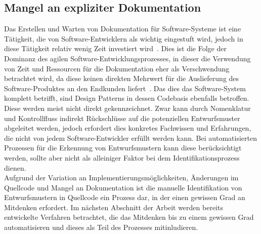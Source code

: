 \subsection{Mangel an expliziter Dokumentation}

Das Erstellen und Warten von Dokumentation für Software-Systeme ist eine Tätigkeit, die von Software-Entwicklern als wichtig eingestuft wird, jedoch in diese Tätigkeit relativ wenig Zeit investiert wird~\cite[S, 162]{zhi2015cost}.
Dies ist die Folge der Dominanz des agilen Software-Entwicklungsprozesses, in dieser die Verwendung von Zeit und Ressourcen für die Dokumentation eher als Verschwendung betrachtet wird, da diese keinen direkten Mehrwert für die Auslieferung des Software-Produktes an den Endkunden liefert~\cite[S. 159]{zhi2015cost}.
Das dies das Software-System komplett betrifft, sind Design Patterns in dessen Codebasis ebenfalls betroffen. Diese werden meist nicht direkt gekennzeichnet. 
Zwar kann durch Nomenklatur und Kontrollfluss indirekt Rückschlüsse auf die potenziellen Entwurfsmuster abgeleitet werden, jedoch erfordert dies konkretes Fachwissen und Erfahrungen, die nicht von jedem Software-Entwickler erfüllt werden kann.
Bei automatisierten Prozessen für die Erkennung von Entwurfsmustern kann diese berücksichtigt werden, sollte aber nicht als alleiniger Faktor bei dem Identifikationsprozess dienen.\\

Aufgrund der Variation an Implementierungsmöglichkeiten, Änderungen im Quellcode und Mangel an Dokumentation ist die manuelle Identifikation von Entwurfsmustern in Quellcode ein Prozess dar,
in der einen gewissen Grad an Mitdenken erfordert. Im nächsten Abschnitt der Arbeit werden bereits entwickelte Verfahren betrachtet, die das Mitdenken bis zu einem gewissen Grad automatisieren und dieses als Teil des Prozesses mitinludieren.




